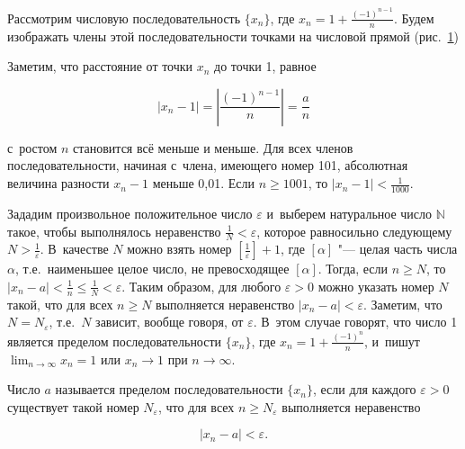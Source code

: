 
Рассмотрим числовую последовательность $\{x_{n}\}$,
где $\displaystyle x_{n} = 1 + \frac{(-1)^{n-1}}{n}$.
Будем изображать члены этой последовательности точками на числовой прямой (рис.\ \ref{fig:3_1_1})

\begin{figure}\label{fig:3_1_1}
\end{figure}

\noindent
Заметим, что расстояние от точки $x_{n}$ до точки 1, равное

\begin{equation*}
\displaystyle |x_{n} - 1| = \left| \frac{(-1)^{n-1}}{n}\right| = \frac{a}{n}
\end{equation*}

\noindent
с~ростом $n$ становится всё меньше и меньше.
Для всех членов последовательности, начиная с~члена, имеющего номер 101,
абсолютная величина разности $x_{n} - 1$ меньше 0,01.
Если $n \geqslant 1001$, то $\displaystyle |x_{n} - 1| < \frac{1}{1000}$.

Зададим произвольное положительное число $\varepsilon$ и~выберем натуральное число
$\mathbb{N}$ такое, чтобы выполнялось неравенство $\displaystyle \frac{1}{N} < \varepsilon$,
которое равносильно следующему $\displaystyle  N > \frac{1}{\varepsilon}$.
В~качестве $N$ можно взять номер $\displaystyle \left[ \frac{1}{\varepsilon} \right] + 1$,
где $[\alpha]$ "--- целая часть числа $\alpha$, т.е.\ наименьшее целое число,
не превосходящее $[\alpha]$. Тогда, если $n \geqslant N$, то
$\displaystyle |x_{n} - a| < \frac{1}{n} \leqslant \frac{1}{N} < \varepsilon$.
Таким образом, для любого $\varepsilon > 0$ можно указать номер $N$ такой,
что для всех $n \geqslant N$ выполняется неравенство $|x_{n} - a| < \varepsilon$.
Заметим, что $N = N_{\varepsilon}$, т.е.\ $N$ зависит, вообще говоря, от $\varepsilon$.
В~этом случае говорят, что число 1 является пределом последовательности $\{x_{n}\}$,
где $\displaystyle x_{n} = 1 + \frac{(-1)^{n}}{n}$,
и~пишут $\displaystyle \lim_{n \to \infty} x_{n} = 1$ или $x_{n} \to 1$ при $n \to \infty$.

\begin{Def} Число $a$ называется пределом последовательности $\{x_{n}\}$,
если для каждого $\varepsilon > 0$ существует такой номер $N_{\varepsilon}$,
что для всех $n \geqslant N_{\varepsilon}$ выполняется неравенство
\end{Def}

\begin{equation}\label{eq:3_1_2}
|x_{n} - a| < \varepsilon.
\end{equation}

